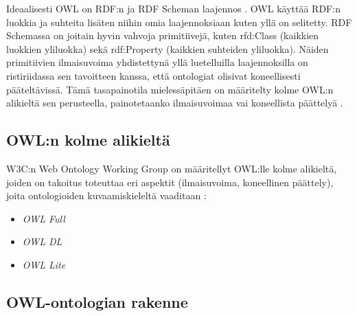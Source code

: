 \documentclass[a4paper,10pt]{article}
\begin{document}
Ideaalisesti OWL on RDF:n ja RDF Scheman laajennos \cite{AH09}. OWL käyttää RDF:n luokkia ja suhteita lisäten niihin omia laajennoksiaan kuten yllä on selitetty. RDF Schemassa on joitain hyvin vahvoja primitiivejä, kuten rfd:Class (kaikkien luokkien yliluokka) sekä rdf:Property (kaikkien suhteiden yliluokka). Näiden primitiivien ilmaisuvoima yhdistettynä yllä luetelluilla laajennoksilla on ristiriidassa sen tavoitteen kanssa, että ontologiat olisivat koneellisesti pääteltävissä. Tämä tasapainotila mielessäpitäen on määritelty kolme OWL:n alikieltä sen perusteella, painotetaanko ilmaisuvoimaa vai koneellista päättelyä \cite{AH09}.  

\subsection{OWL:n kolme alikieltä}

W3C:n Web Ontology Working Group on määritellyt OWL:lle kolme alikieltä, joiden on takoitus toteuttaa eri aspektit (ilmaisuvoima, koneellinen päättely), joita ontologioiden kuvaamiskieleltä vaaditaan \cite{MH04}:

\begin{itemize}
 \item \textit{OWL Full}
 \item \textit{OWL DL}
 \item \textit{OWL Lite}
\end{itemize}




\subsection{OWL-ontologian rakenne}
\end{document}
